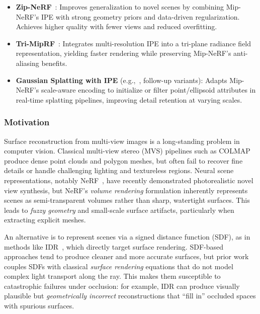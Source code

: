 \begin{enrichment}
\begin{enrichment}
\begin{itemize}
        \item \textbf{Zip-NeRF}~\cite{barron2023_zipnerf}: Improves generalization to novel scenes by combining Mip-NeRF’s IPE with strong geometry priors and data-driven regularization. Achieves higher quality with fewer views and reduced overfitting.
        
        \item \textbf{Tri-MipRF}~\cite{hu2023_trimiprf}: Integrates multi-resolution IPE into a tri-plane radiance field representation, yielding faster rendering while preserving Mip-NeRF’s anti-aliasing benefits.
        
        \item \textbf{Gaussian Splatting with IPE} (e.g.,~\cite{kerbl2023_3dgaussiansplatting}, follow-up variants): Adapts Mip-NeRF’s scale-aware encoding to initialize or filter point/ellipsoid attributes in real-time splatting pipelines, improving detail retention at varying scales.
    \end{itemize}

    \end{enrichment}
    
    \begin{enrichment}
        \label{enr:subsec_chapter23_neus}
        
        \subsubsection{Motivation}
        \label{subsec:chapter23_neus_motivation}
        
        Surface reconstruction from multi-view images is a long-standing problem in computer vision. Classical multi-view stereo (MVS) pipelines such as COLMAP produce dense point clouds and polygon meshes, but often fail to recover fine details or handle challenging lighting and textureless regions. Neural scene representations, notably NeRF~\cite{mildenhall2020_nerf}, have recently demonstrated photorealistic novel view synthesis, but NeRF’s \emph{volume rendering} formulation inherently represents scenes as semi-transparent volumes rather than sharp, watertight surfaces. This leads to \emph{fuzzy geometry} and small-scale surface artifacts, particularly when extracting explicit meshes.
        
        An alternative is to represent scenes via a signed distance function (SDF), as in methods like IDR~\cite{yariv2020_idr}, which directly target surface rendering. SDF-based approaches tend to produce cleaner and more accurate surfaces, but prior work couples SDFs with classical \emph{surface rendering} equations that do not model complex light transport along the ray. This makes them susceptible to catastrophic failures under occlusion: for example, IDR can produce visually plausible but \emph{geometrically incorrect} reconstructions that “fill in” occluded spaces with spurious surfaces.
        

\end{enrichment}
\end{enrichment}
